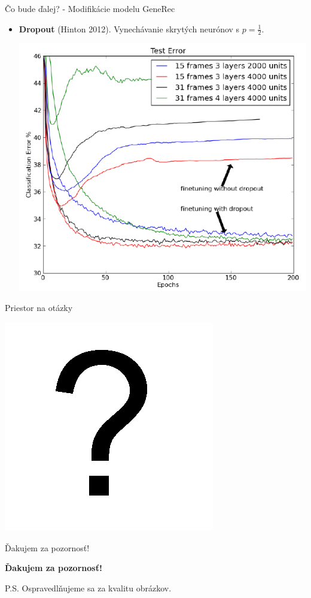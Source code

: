 \documentclass[xcolor=dvipsnames]{beamer}
\begin{document}
\begin{frame}{Čo bude ďalej? - Modifikácie modelu GeneRec}
  \begin{itemize}
    \item \textbf{Dropout} (Hinton 2012). Vynechávanie skrytých neurónov s $p=\frac{1}{2}$. 
    \begin{center}
      \includegraphics[scale=0.4]{img/dropout.png}
    \end{center}
  \end{itemize}
\end{frame}

\begin{frame}{Priestor na otázky}
  \begin{center}
  \includegraphics[scale=0.75]{img/question.png}
  \end{center}
\end{frame}

\begin{frame}{Ďakujem za pozornosť!}
  \begin{center}
{\bf Ďakujem za pozornosť!} 
  \end{center}
  
  \vspace{3cm}
  
  \begin{center}
  \small{P.S. Ospravedlňujeme sa za kvalitu obrázkov.}
  \end{center}
\end{frame}
\end{document}
